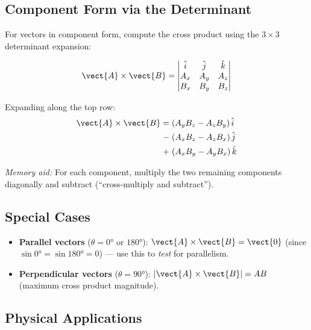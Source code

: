 \subsection*{Component Form via the Determinant}

For vectors in component form, compute the cross product
using the $3\times 3$ determinant expansion:

\vspace{2.0cm}
\begin{lawbox}
\[
  \vect{A}\times\vect{B}
  = \begin{vmatrix}
    \hat{i} & \hat{j} & \hat{k}\\
    A_x & A_y & A_z\\
    B_x & B_y & B_z
  \end{vmatrix}
\]

Expanding along the top row:
\begin{align*}
  \vect{A}\times\vect{B}
  =\;
  &(A_y B_z - A_z B_y)\,\hat{i}\\
  -\;&(A_x B_z - A_z B_x)\,\hat{j}\\
  +\;&(A_x B_y - A_y B_x)\,\hat{k}
\end{align*}

\textit{Memory aid:} For each component, multiply the
two remaining components diagonally and subtract
(``cross-multiply and subtract'').
\end{lawbox}

\subsection*{Special Cases}

\begin{itemize}[noitemsep]
  \item \textbf{Parallel vectors} ($\theta = 0°$ or
  $180°$): $\vect{A}\times\vect{B} = \vect{0}$
  (since $\sin 0° = \sin 180° = 0$) ---
  use this to \textit{test} for parallelism.
  \item \textbf{Perpendicular vectors} ($\theta = 90°$):
  $|\vect{A}\times\vect{B}| = AB$ (maximum cross product
  magnitude).
\end{itemize}

\subsection*{Physical Applications}

